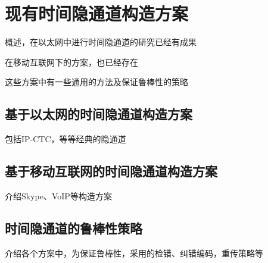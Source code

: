 \section{现有时间隐通道构造方案}
\label{chap:backinfo:ctc}

概述，在以太网中进行时间隐通道的研究已经有成果

在移动互联网下的方案，也已经存在

这些方案中有一些通用的方法及保证鲁棒性的策略

\subsection{基于以太网的时间隐通道构造方案}
\label{chap:backinfo:ctc:ethernet}

包括IP-CTC，等等经典的隐通道

\subsection{基于移动互联网的时间隐通道构造方案}
\label{chap:backinfo:ctc:mobile}

介绍Skype、VoIP等构造方案

\subsection{时间隐通道的鲁棒性策略}
\label{chap:backinfo:ctc:robustness}

介绍各个方案中，为保证鲁棒性，采用的检错、纠错编码，重传策略等